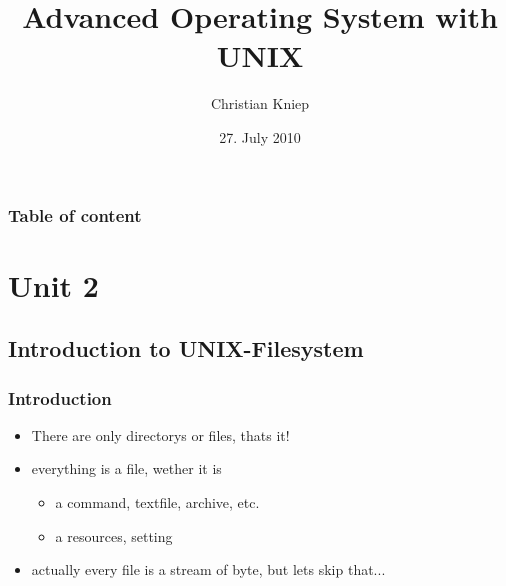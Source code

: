 \documentclass[hyperref={pdfpagelabels=false}]{beamer}
\author{Christian Kniep}
\begin{document}
\title[UNIX]{Advanced Operating System with UNIX}  
\date[27.07.2010]{27. July 2010} 

\begin{frame}
	\titlepage
\end{frame} 

\begin{frame}
	\frametitle{Table of content}
	\tableofcontents
\end{frame} 


\section{Unit 2} 
	\subsection{Introduction to UNIX-Filesystem}
		\begin{frame}
			\frametitle{Introduction}
			\begin{itemize}
				\item<2-> There are only directorys or files, thats it!
                \item<3-> everything is a file, wether it is
                \begin{itemize}
                    \item<4-> a command, textfile, archive, etc.
                    \item<5-> a resources, setting
                \end{itemize}
                \item<6-> actually every file is a stream of byte, but lets skip that...
            \end{itemize}
		\end{frame}
\end{document}
